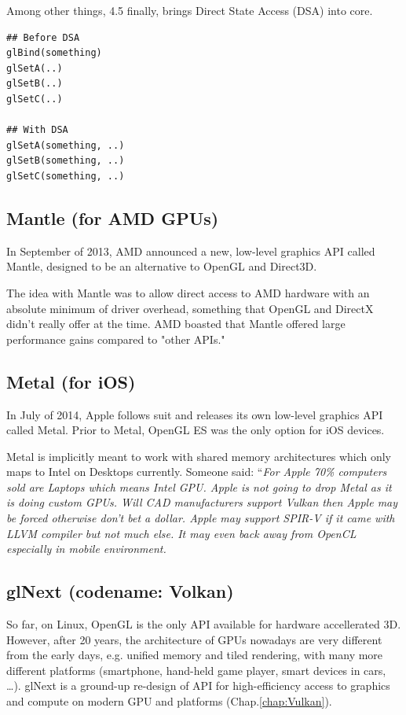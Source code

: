 Among other things, 4.5 finally, brings Direct State Access (DSA) into
core. 
\begin{verbatim}
## Before DSA
glBind(something)
glSetA(..)
glSetB(..)
glSetC(..)

## With DSA
glSetA(something, ..)
glSetB(something, ..)
glSetC(something, ..)
\end{verbatim}

\subsection{Mantle (for AMD GPUs)}
\label{sec:Mantle}

In September of 2013, AMD announced a new, low-level graphics API called Mantle,
designed to be an alternative to OpenGL and Direct3D.

The idea with Mantle was to allow direct access to AMD hardware with an absolute
minimum of driver overhead, something that OpenGL and DirectX didn't really
offer at the time. AMD boasted that Mantle offered large performance gains
compared to "other APIs."

\subsection{Metal (for iOS)}
\label{sec:Metal}


In July of 2014, Apple follows suit and releases its own low-level graphics API
called Metal. Prior to Metal, OpenGL ES was the only option for iOS devices.

Metal is implicitly meant to work with shared memory architectures which only
maps to Intel on Desktops currently.
Someone said: ``{\it For Apple 70\% computers sold are Laptops which means Intel
GPU. Apple is not going to drop Metal as it is doing custom GPUs.
Will CAD manufacturers support Vulkan then Apple may be forced
otherwise don't bet a dollar. Apple may support SPIR-V if it came with LLVM compiler but not much else.
It may even back away from OpenCL especially in mobile environment.}
 
\subsection{glNext (codename: Volkan)}
\label{sec:glNext}

So far, on Linux, OpenGL is the only API available for hardware accellerated 3D.
However, after 20 years, the architecture of GPUs nowadays are very different
from the early days, e.g. unified memory and tiled rendering, with many more
different platforms (smartphone, hand-held game player, smart devices in cars,
\ldots). glNext is a ground-up re-design of API for high-efficiency access to
graphics and compute on modern GPU and platforms (Chap.\ref{chap:Vulkan}).




